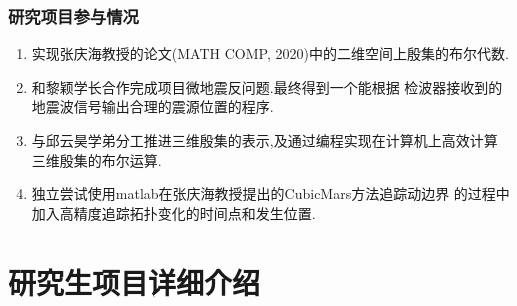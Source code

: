 \documentclass[UTF8]{ctexbeamer}	%
\theoremstyle{plain}
\theoremstyle{definition}
\theoremstyle{remark}
\numberwithin{equation}{section}
\begin{document}
\begin{frame}[fragile]
   \frametitle{研究项目参与情况}
    \small{\begin{enumerate}
        \item 实现张庆海教授的论文(MATH COMP, 2020)中的二维空间上殷集的布尔代数.
        \item 和黎颖学长合作完成项目微地震反问题.最终得到一个能根据
        检波器接收到的地震波信号输出合理的震源位置的程序.
        \item 与邱云昊学弟分工推进三维殷集的表示,及通过编程实现在计算机上高效计算
        三维殷集的布尔运算.
        \item 独立尝试使用matlab在张庆海教授提出的CubicMars方法追踪动边界
        的过程中加入高精度追踪拓扑变化的时间点和发生位置.
    \end{enumerate}}
\end{frame}

\section{研究生项目详细介绍}

\end{document}
